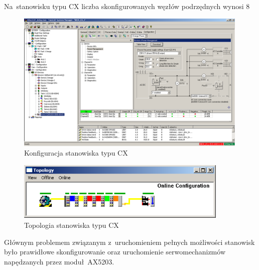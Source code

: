 Na~stanowisku typu CX liczba skonfigurowanych węzłów podrzędnych wynosi 8
\begin{figure}[!htb] 	\centering 	\includegraphics[width=0.99\textwidth]{images/confCX} \caption{Konfiguracja stanowiska typu CX} \label{conf:cx} \end{figure}
\begin{figure}[!htb] 	\centering 	\includegraphics[width=0.9\textwidth]{images/topologyCX} \caption{Topologia stanowiska typu CX} \label{topology:cx} \end{figure}

Głównym problemem związanym z~uruchomieniem pełnych możliwości stanowisk było prawidłowe skonfigurowanie oraz uruchomienie serwomechanizmów napędzanych przez moduł~AX5203.
%
%

%
%
%
